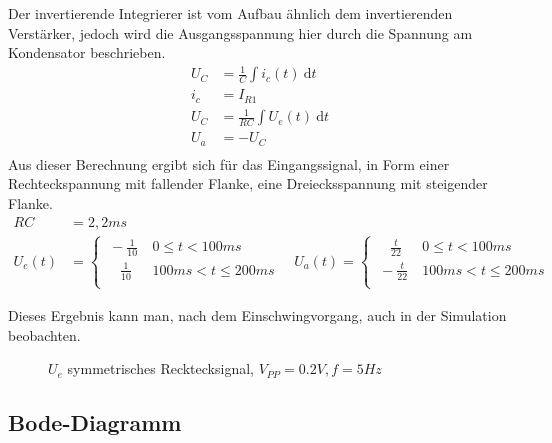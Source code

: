 Der invertierende Integrierer ist vom Aufbau ähnlich dem invertierenden Verstärker, jedoch wird die Ausgangsspannung hier durch die Spannung am Kondensator beschrieben.\\
\begin{align*}
 U_C &= \frac{1}{C} \int i_c(t)\ \mathrm{d}t\\
 i_c &= I_{R1}\\
 U_C &= \frac{1}{RC} \int U_e(t)\ \mathrm{d}t\\
 U_a &= -U_C\\
\end{align*}
\noindent
Aus dieser Berechnung ergibt sich für das Eingangssignal, in Form einer Rechteckspannung mit fallender Flanke, eine Dreiecksspannung mit steigender Flanke.\\
\begin{align*}
 RC &= 2,2ms\\
 U_e(t) &= 
  \begin{cases}
   \ -\frac{1}{10}\ &0 \leq t < 100ms\\
   \quad \frac{1}{10}\ &100ms < t \leq 200ms\\ 
  \end{cases}
  \quad
  U_a(t) = 
  \begin{cases}
   \quad \frac{t}{22}\ &0 \leq t < 100ms\\
   \ -\frac{t}{22}\ &100ms < t \leq 200ms\\ 
  \end{cases}
\end{align*}

Dieses Ergebnis kann man, nach dem Einschwingvorgang, auch in der Simulation beobachten.\\

\begin{figure}[H]
  \centering
  \caption{$U_e$ symmetrisches Recktecksignal, $V_{PP}=0.2V, f=5Hz$}
\end{figure}

\subsection{Bode-Diagramm}

